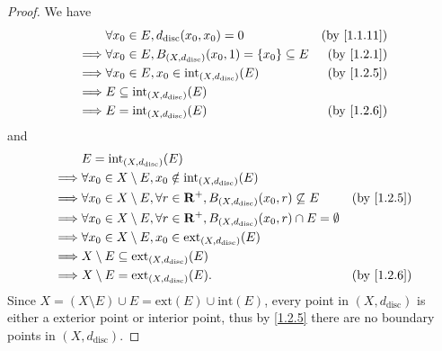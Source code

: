 \begin{proof}
  We have
  \begin{align*}
             & \forall x_0 \in E, d_{\text{disc}}(x_0, x_0) = 0                          & \text{(by \cref{1.1.11})} \\
    \implies & \forall x_0 \in E, B_{(X, d_{\text{disc}})}(x_0, 1) = \{x_0\} \subseteq E & \text{(by \cref{1.2.1})}  \\
    \implies & \forall x_0 \in E, x_0 \in \text{int}_{(X, d_{\text{disc}})}(E)           & \text{(by \cref{1.2.5})}  \\
    \implies & E \subseteq \text{int}_{(X, d_{\text{disc}})}(E)                                                      \\
    \implies & E = \text{int}_{(X, d_{\text{disc}})}(E)                                  & \text{(by \cref{1.2.6})}
  \end{align*}
  and
  \begin{align*}
             & E = \text{int}_{(X, d_{\text{disc}})}(E)                                                                                          \\
    \implies & \forall x_0 \in X \setminus E, x_0 \notin \text{int}_{(X, d_{\text{disc}})}(E)                                                    \\
    \implies & \forall x_0 \in X \setminus E, \forall r \in \R^+, B_{(X, d_{\text{disc}})}(x_0, r) \not\subseteq E    & \text{(by \cref{1.2.5})} \\
    \implies & \forall x_0 \in X \setminus E, \forall r \in \R^+, B_{(X, d_{\text{disc}})}(x_0, r) \cap E = \emptyset                            \\
    \implies & \forall x_0 \in X \setminus E, x_0 \in \text{ext}_{(X, d_{\text{disc}})}(E)                                                       \\
    \implies & X \setminus E \subseteq \text{ext}_{(X, d_{\text{disc}})}(E)                                                                      \\
    \implies & X \setminus E = \text{ext}_{(X, d_{\text{disc}})}(E).                                                  & \text{(by \cref{1.2.6})}
  \end{align*}
  Since \(X = (X \setminus E) \cup E = \text{ext}(E) \cup \text{int}(E)\), every point in \((X, d_{\text{disc}})\) is either a exterior point or interior point, thus by \cref{1.2.5} there are no boundary points in \((X, d_{\text{disc}})\).
\end{proof}


